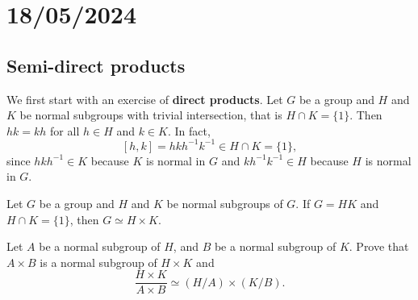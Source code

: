 \section{18/05/2024}

\subsection{Semi-direct products}

We first start with an exercise of \textbf{direct products}. Let $G$ be a group and $H$ and $K$ be normal subgroups with trivial intersection, that is $H\cap K=\{1\}$. 
Then $hk=kh$ for all $h\in H$ and $k\in K$. In fact, 
\[
[h,k]=hkh^{-1}k^{-1}\in H\cap K=\{1\}, 
\]
since $hkh^{-1}\in K$ because $K$ is normal in $G$ and 
$kh^{-1}k^{-1}\in H$ because $H$ is normal in $G$. 

\begin{exercise}
\label{xca:direct_product}
Let $G$ be a group and $H$ and $K$ be normal subgroups of $G$.
If $G=HK$ and $H\cap K=\{1\}$, then $G\simeq H\times K$.
\end{exercise}




\begin{exercise}
Let $A$ be a normal subgroup of $H$, and $B$ be a normal subgroup of $K$. 
Prove that $A\times B$ is a normal subgroup of
$H\times K$ and 
\[
\frac{H\times K}{A\times B}\simeq(H/A)\times(K/B).
\]
\end{exercise}

